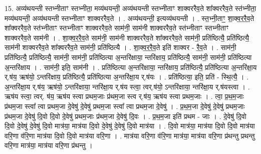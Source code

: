 \documentclass[17pt]{extarticle}
\begin{document}
15. अव्य॑थयन्ती स्तभ्नीताꣳ स्तभ्नीता॒ मव्य॑थयन्ती॒ अव्य॑थयन्ती स्तभ्नीताꣳ शाक्वररैव॒ते शा᳚क्वररैव॒ते स्त॑भ्नीता॒ मव्य॑थयन्ती॒ अव्य॑थयन्ती स्तभ्नीताꣳ शाक्वररैव॒ते । . अव्य॑थयन्ती॒ इत्यव्य॑थयन्ती । . स्त॒भ्नी॒ताꣳ॒॒ शा॒क्व॒र॒रै॒व॒ते शा᳚क्वररैव॒ते स्त॑भ्नीताꣳ स्तभ्नीताꣳ शाक्वररैव॒ते साम॑नी॒ साम॑नी शाक्वररैव॒ते स्त॑भ्नीताꣳ स्तभ्नीताꣳ शाक्वररैव॒ते साम॑नी । . शा॒क्व॒र॒रै॒व॒ते साम॑नी॒ साम॑नी शाक्वररैव॒ते शा᳚क्वररैव॒ते साम॑नी॒ प्रति॑ष्ठित्यै॒ प्रति॑ष्ठित्यै॒ साम॑नी शाक्वररैव॒ते शा᳚क्वररैव॒ते साम॑नी॒ प्रति॑ष्ठित्यै । . शा॒क्व॒र॒रै॒व॒ते इति॑ शाक्वर - रै॒व॒ते । . साम॑नी॒ प्रति॑ष्ठित्यै॒ प्रति॑ष्ठित्यै॒ साम॑नी॒ साम॑नी॒ प्रति॑ष्ठित्या अ॒न्तरि॑क्षाया॒ न्तरि॑क्षाय॒ प्रति॑ष्ठित्यै॒ साम॑नी॒ साम॑नी॒ प्रति॑ष्ठित्या अ॒न्तरि॑क्षाय । . साम॑नी॒ इति॒ साम॑नी । . प्रति॑ष्ठित्या अ॒न्तरि॑क्षाया॒ न्तरि॑क्षाय॒ प्रति॑ष्ठित्यै॒ प्रति॑ष्ठित्या अ॒न्तरि॑क्षा॒य र्.ष॑य॒ ऋष॑यो॒ ऽन्तरि॑क्षाय॒ प्रति॑ष्ठित्यै॒ प्रति॑ष्ठित्या अ॒न्तरि॑क्षा॒य र्.ष॑यः । . प्रति॑ष्ठित्या॒ इति॒ प्रति॑ - स्थि॒त्यै॒ । . अ॒न्तरि॑क्षा॒य र्.ष॑य॒ ऋष॑यो॒ ऽन्तरि॑क्षाया॒ न्तरि॑क्षा॒य र्.ष॑य स्त्वा॒ त्वर्.ष॑यो॒ ऽन्तरि॑क्षाया॒ न्तरि॑क्षा॒य र्.ष॑यस्त्वा । . ऋष॑य स्त्वा॒ त्वर्. ष॑य॒ ऋष॑य स्त्वा प्रथम॒जाः प्र॑थम॒जा स्त्व र्.ष॑य॒ ऋष॑य स्त्वा प्रथम॒जाः । . त्वा॒ प्र॒थ॒म॒जाः प्र॑थम॒जा स्त्वा᳚ त्वा प्रथम॒जा दे॒वेषु॑ दे॒वेषु॑ प्रथम॒जा स्त्वा᳚ त्वा प्रथम॒जा दे॒वेषु॑ । . प्र॒थ॒म॒जा दे॒वेषु॑ दे॒वेषु॑ प्रथम॒जाः प्र॑थम॒जा दे॒वेषु॑ दि॒वो दि॒वो दे॒वेषु॑ प्रथम॒जाः प्र॑थम॒जा दे॒वेषु॑ दि॒वः । . प्र॒थ॒म॒जा इति॑ प्रथम - जाः । . दे॒वेषु॑ दि॒वो दि॒वो दे॒वेषु॑ दे॒वेषु॑ दि॒वो मात्र॑या॒ मात्र॑या दि॒वो दे॒वेषु॑ दे॒वेषु॑ दि॒वो मात्र॑या । . दि॒वो मात्र॑या॒ मात्र॑या दि॒वो दि॒वो मात्र॑या वरि॒णा व॑रि॒णा मात्र॑या दि॒वो दि॒वो मात्र॑या वरि॒णा । . मात्र॑या वरि॒णा व॑रि॒णा मात्र॑या॒ मात्र॑या वरि॒णा प्र॑थन्तु प्रथन्तु वरि॒णा मात्र॑या॒ मात्र॑या वरि॒णा प्र॑थन्तु । \newline
\end{document}

